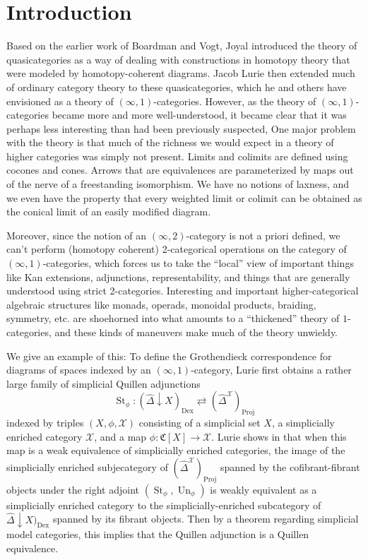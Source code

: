 \documentclass{amsbook}
\theoremstyle{plain}   %
\theoremstyle{remark}
\theoremstyle{plain}
\newcommand{\psh}[1]{\ensuremath{\widehat{#1}}}
\numberwithin{section}{chapter}
\begin{document}
\chapter*{Introduction}
Based on the earlier work of Boardman and Vogt, Joyal introduced the theory of quasicategories as a way of dealing with constructions in homotopy theory that were modeled by homotopy-coherent diagrams.  Jacob Lurie then extended much of ordinary category theory to these quasicategories, which he and others have envisioned as a theory of \((\infty,1)\)-categories. However, as the theory of \((\infty,1)\)-categories became more and more well-understood, it became clear that it was perhaps less interesting than had been previously suspected, One major problem with the theory is that much of the richness we would expect in a theory of higher categories was simply not present. Limits and colimits are defined using cocones and cones.  Arrows that are equivalences are parameterized by maps out of the nerve of a freestanding isomorphism.  We have no notions of laxness, and we even have the property that every weighted limit or colimit can be obtained as the conical limit of an easily modified diagram.   

Moreover, since the notion of an \((\infty,2)\)-category is not a priori defined, we can't perform (homotopy coherent) 2-categorical operations on the category of \((\infty,1)\)-categories, which forces us to take the ``local'' view  of important things like Kan extensions, adjunctions, representability, and things that are generally understood using strict 2-categories.  Interesting and important higher-categorical algebraic structures like monads, operads, monoidal products, braiding, symmetry, etc. are shoehorned into what amounts to a ``thickened'' theory of \(1\)-categories, and these kinds of maneuvers make much of the theory unwieldy. 

We give an example of this: To define the Grothendieck correspondence for diagrams of spaces indexed by an \((\infty,1)\)-category, Lurie first obtains a rather large family of simplicial Quillen adjunctions \[\operatorname{St}_\phi:(\psh{\Delta}\downarrow X)_{\operatorname{Dex}} \rightleftarrows  (\psh{\Delta}^{\mathcal{X}})_{\operatorname{Proj}}\] indexed by triples \((X, \phi, \mathcal{X})\) consisting of a simplicial set \(X\), a simplicially enriched category \(\mathcal{X}\), and a map \(\phi:\mathfrak{C}[X]\to \mathcal{X}\).  Lurie shows in \cite{htt} that when this map is a weak equivalence of simplicially enriched categories, the image of the simplicially enriched subjecategory of \((\psh{\Delta}^{\mathcal{X}})_{\operatorname{Proj}}\) spanned by the cofibrant-fibrant objects under the right adjoint \((\operatorname{St}_\phi,\operatorname{Un}_\phi)\) is weakly equivalent as a simplicially enriched category to the simplicially-enriched subcategory of  \(\psh{\Delta}\downarrow X)_{\operatorname{Dex}} \) spanned by its fibrant objects.  Then by a theorem regarding simplicial model categories, this implies that the Quillen adjunction is a Quillen equivalence.  
\end{document}
